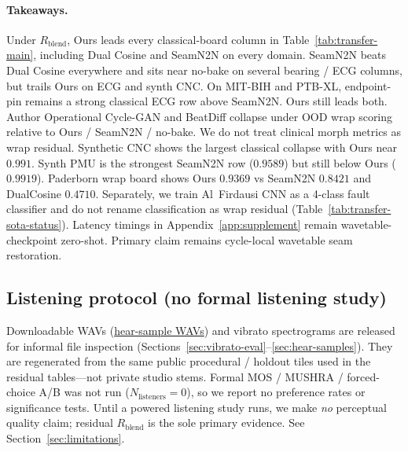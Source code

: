 \paragraph{Takeaways.}
Under $R_{\mathrm{blend}}$, Ours leads every classical-board column in Table~\ref{tab:transfer-main},
including Dual Cosine and SeamN2N on every domain.
SeamN2N beats Dual Cosine everywhere and sits near no-bake on several bearing / ECG columns, but trails Ours
on ECG and synth CNC.
On MIT-BIH and PTB-XL, endpoint-pin remains a strong classical ECG row above SeamN2N. Ours still leads both.
Author Operational Cycle-GAN and BeatDiff collapse under OOD wrap scoring relative to Ours / SeamN2N / no-bake.
We do not treat clinical morph metrics as wrap residual.
Synthetic CNC shows the largest classical collapse with Ours near $0.991$.
Synth PMU is the strongest SeamN2N row ($0.9589$) but still below Ours ($0.9919$).
Paderborn wrap board shows Ours $0.9369$ vs SeamN2N $0.8421$ and DualCosine $0.4710$.
Separately, we train Al~Firdausi CNN as a 4-class fault classifier and do not rename classification as wrap residual
(Table~\ref{tab:transfer-sota-status}).
Latency timings in Appendix~\ref{app:supplement} remain wavetable-checkpoint zero-shot.
Primary claim remains cycle-local wavetable seam restoration.

\subsection{Listening protocol (no formal listening study)}
\label{sec:listening-protocol}

Downloadable WAVs
(\href{https://github.com/reeldemo/reelsynth/tree/main/brand/artifacts/meta_approach_compare/hear_samples}{hear-sample WAVs})
and vibrato spectrograms are released for informal file inspection
(Sections~\ref{sec:vibrato-eval}--\ref{sec:hear-samples}).
They are regenerated from the same public procedural / holdout tiles used in the residual tables---not private studio stems.
Formal MOS / MUSHRA / forced-choice A/B was not run ($N_{\mathrm{listeners}}{=}0$), so we report no preference rates or significance tests.
Until a powered listening study runs, we make \emph{no} perceptual quality claim; residual $R_{\mathrm{blend}}$ is the sole primary evidence.
See Section~\ref{sec:limitations}.
